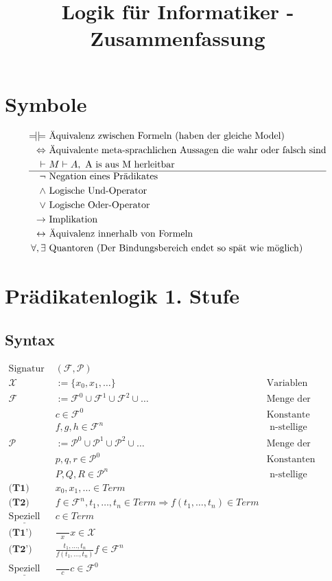 \documentclass{article}
\title{Logik f\"ur Informatiker - Zusammenfassung}
\DeclareRobustCommand*{\tautequiv}{%
  \Relbar\joinrel\mathrel{|}
  \mathrel{|}\joinrel\Relbar%
}
\begin{document}
	\section*{Symbole}
		\begin{align*}
			\tautequiv & \text{ \"Aquivalenz zwischen Formeln (haben der gleiche Model)}\\
			\Leftrightarrow & \text{ \"Aquivalente meta-sprachlichen Aussagen die wahr oder falsch sind}\\
			\vdash &\ M \vdash A, \text{ A is aus M herleitbar}\\
			\hline
			\neg & \text{ Negation eines Pr\"adikates}\\
			\wedge & \text{ Logische Und-Operator}\\
			\vee & \text{ Logische Oder-Operator}\\
			\rightarrow & \text{ Implikation}\\
			\leftrightarrow & \text{ \"Aquivalenz innerhalb von Formeln}\\
			\forall, \exists & \text{ Quantoren (Der Bindungsbereich endet so sp\"at wie m\"oglich)}\\
		\end{align*}
	\section{Pr\"adikatenlogik 1. Stufe}
		\subsection{Syntax}
			\begin{align*}
				\text{Signatur } & (\mathcal{F, P}) & \\
				\mathcal{X}\ & := \{x_0, x_1, \ldots\} & \text{Variablen}\\
				\mathcal{F}\ & := \mathcal{F}^0 \cup \mathcal{F}^1 \cup \mathcal{F}^2 \cup \ldots & \text{Menge der Funktionen}\\
				& c \in \mathcal{F}^0 & \text{Konstante}\\
				& f, g, h \in \mathcal{F}^n & \text{ n-stellige Funktionssymbole}\\
				\mathcal{P}\ & := \mathcal{P}^0 \cup \mathcal{P}^1 \cup \mathcal{P}^2 \cup \ldots & \text{Menge der Pr\"adikate}\\
				& p, q, r \in \mathcal{P}^0 & \text{Konstanten}\\
				& P, Q, R \in \mathcal{P}^n & \text{ n-stellige Pr\"adikatensymbole}\\\hline
				\textbf{(T1) } &  x_0, x_1, \ldots \in Term& \\
				\textbf{(T2) } & f \in \mathcal{F}^n, t_1, \ldots, t_n \in Term \Rightarrow f(t_1, \ldots, t_n) \in Term & \\
				\underline{\text{Speziell}}\ & c \in Term & \\
				\textbf{(T1') } & \frac{\qquad}{x}  x \in \mathcal{X} & \\
				\textbf{(T2') } & \frac{t_1, \ldots, t_n}{f(t_1, \ldots, t_n)}  f \in \mathcal{F}^n & \\
				\underline{\text{Speziell}}\ & \frac{\qquad}{c} c \in \mathcal{F}^0 & \\
			\end{align*}
\end{document}
